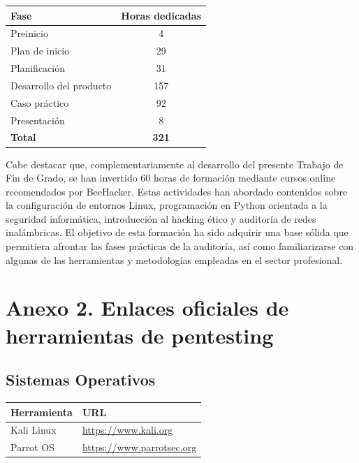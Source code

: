 \documentclass[a4paper, 11pt]{article}
\begin{document}
\begin{center}
\begin{tabular}{|l|c|}
\hline
\textbf{Fase} & \textbf{Horas dedicadas} \\
\hline
Preinicio & 4 \\
Plan de inicio & 29 \\
Planificación & 31 \\
Desarrollo del producto & 157 \\
Caso práctico & 92 \\
Presentación & 8 \\
\hline
\textbf{Total} & \textbf{321} \\
\hline
\end{tabular}
\end{center}

Cabe destacar que, complementariamente al desarrollo del presente Trabajo de Fin de Grado, se han invertido 60 horas de formación mediante cursos online recomendados por BeeHacker. Estas actividades han abordado contenidos sobre la configuración de entornos Linux, programación en Python orientada a la seguridad informática, introducción al hacking ético y auditoría de redes inalámbricas. 
El objetivo de esta formación ha sido adquirir una base sólida que permitiera afrontar las fases prácticas de la auditoría, así como familiarizarse con algunas de las herramientas y metodologías empleadas en el sector profesional. 

\clearpage
\thispagestyle{nohead}
\section*{Anexo 2. Enlaces oficiales de herramientas de pentesting}
\label{anexo:2}

\subsection*{Sistemas Operativos}
\begin{table}[H]
\centering
\begin{tabular}{|m{5cm}|m{10cm}|}
\hline
\textbf{Herramienta} & \textbf{URL} \\
\hline
Kali Linux & \url{https://www.kali.org} \\
\hline
Parrot OS & \url{https://www.parrotsec.org} \\
\hline
\end{tabular}
\end{table}
\end{document}
